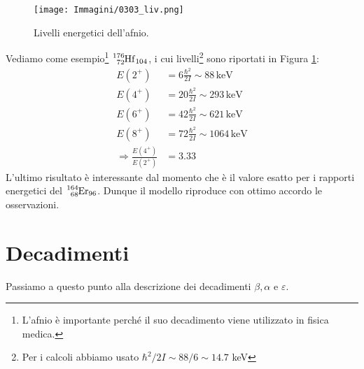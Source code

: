 \begin{figure}[h]
    \centering
    \texttt{[image: Immagini/0303\_liv.png]}
    \caption{Livelli energetici dell'afnio.}
    \label{0303_livel}
\end{figure}
\noindent Vediamo come esempio\footnote{L'afnio è importante perché il suo decadimento viene utilizzato in fisica medica.} $\ce{^{176}_{72}Hf_{104}}$, i cui livelli\footnote{Per i calcoli abbiamo usato $\hbar^2/2I \sim 88/6 \sim 14.7$ keV} sono riportati in Figura \ref{0303_livel}:
\begin{displaymath}
\begin{aligned}
E(2^+)&= 6\frac{\hbar^2}{2I}\sim 88\, \mbox{keV} \\
E(4^+)&= 20\frac{\hbar^2}{2I}\sim 293\, \mbox{keV} \\
E(6^+)&= 42\frac{\hbar^2}{2I}\sim 621\, \mbox{keV} \\
E(8^+)&= 72\frac{\hbar^2}{2I}\sim 1064\, \mbox{keV} \\
\Rightarrow \frac{E(4^+)}{E(2^+)}&= 3.33
\end{aligned}
\end{displaymath}
L'ultimo risultato è interessante dal momento che è il valore esatto per i rapporti energetici del $\ce{^{164}_{68}Er_{96}}$. Dunque il modello riproduce con ottimo accordo le osservazioni.


\chapter{Decadimenti}
Passiamo a questo punto alla descrizione dei decadimenti $\beta,\alpha$ e $\varepsilon$.

